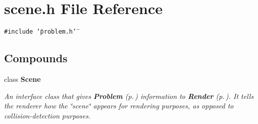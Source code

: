 \section{scene.h File Reference}
\label{scene_h}
{\tt \#include \char`\"{}problem.h\char`\"{}}\par
\subsection*{Compounds}
\begin{CompactItemize}
\item 
class {\bf Scene}
\begin{CompactList}\small\item\em An interface class that gives {\bf Problem} {\rm (p.\,\pageref{class_Problem})} information to {\bf Render} {\rm (p.\,\pageref{class_Render})}. It tells the renderer how the \char`\"{}scene\char`\"{} appears for rendering purposes, as opposed to collision-detection purposes.\item\end{CompactList}\end{CompactItemize}
